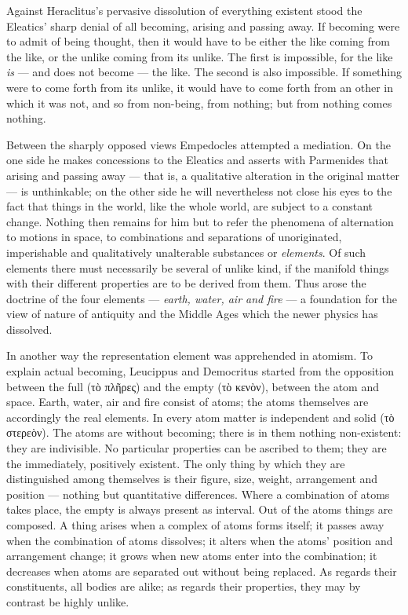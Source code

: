 \documentclass[12pt,a4paper]{book}
\begin{document}
Against Heraclitus's pervasive dissolution of everything existent stood the Eleatics' sharp denial of all
becoming, arising and passing away. If becoming were to admit of being thought, then it would have to be either
the like coming from the like, or the unlike coming from its unlike. The first is impossible, for the like
\emph{is} --- and does not become --- the like. The second is also impossible. If something were to come forth
from its unlike, it would have to come forth from an other in which it was not, and so from non-being, from
nothing; but from nothing comes nothing.

Between the sharply opposed views Empedocles attempted a mediation. On the one side he makes concessions to the
Eleatics and asserts with Parmenides that arising and passing away --- that is, a qualitative alteration in the
original matter --- is unthinkable; on the other side he will nevertheless not close his eyes to the fact that
things in the world, like the whole world, are subject to a constant change. Nothing then remains for him but to
refer the phenomena of alternation to motions in space, to combinations and separations of unoriginated,
imperishable and qualitatively unalterable substances or \emph{elements}. Of such elements there must necessarily
be several of unlike kind, if the manifold things with their different properties are to be derived from them.
Thus arose the doctrine of the four elements --- \emph{earth, water, air and fire} --- a foundation for the view
of nature of antiquity and the Middle Ages which the newer physics has dissolved.

In another way the representation element was apprehended in atomism. To explain actual becoming, Leucippus and
Democritus started from the opposition between the full (τὸ πλῆρες) and the empty (τὸ κενὸν), between
the atom and space. Earth, water, air and fire consist of atoms; the atoms themselves are accordingly the real
elements. In every atom matter is independent and solid (τὸ στερεὸν). The atoms are without becoming; there is
in them nothing non-existent: they are indivisible. No particular properties can be ascribed to them; they are
the immediately, positively existent. The only thing by which they are distinguished among themselves is their
figure, size, weight, arrangement and position --- nothing but quantitative differences. Where a combination of
atoms takes place, the empty is always present as interval. Out of the atoms things are composed. A thing arises
when a complex of atoms forms itself; it passes away when the combination of atoms dissolves; it alters when the
atoms' position and arrangement change; it grows when new atoms enter into the combination; it decreases when
atoms are separated out without being replaced. As regards their constituents, all bodies are alike; as regards
their properties, they may by contrast be highly unlike.
\end{document}
